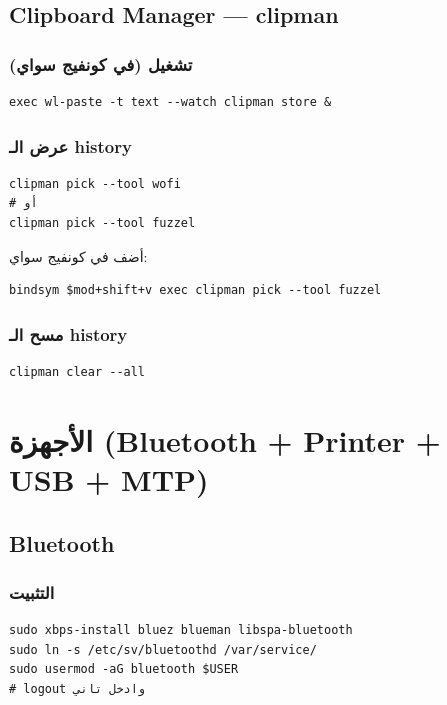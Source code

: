 \documentclass[12pt, a4paper]{report}
\begin{document}
\section{Clipboard Manager — clipman}

\subsection{تشغيل (في كونفيج سواي)}
\begin{lstlisting}
exec wl-paste -t text --watch clipman store &
\end{lstlisting}

\subsection{عرض الـ history}
\begin{lstlisting}
clipman pick --tool wofi
# أو
clipman pick --tool fuzzel
\end{lstlisting}

أضف في كونفيج سواي:
\begin{lstlisting}
bindsym $mod+shift+v exec clipman pick --tool fuzzel
\end{lstlisting}

\subsection{مسح الـ history}
\begin{lstlisting}
clipman clear --all
\end{lstlisting}

\chapter{الأجهزة (Bluetooth + Printer + USB + MTP)}

\section{Bluetooth}

\subsection{التثبيت}
\begin{lstlisting}
sudo xbps-install bluez blueman libspa-bluetooth
sudo ln -s /etc/sv/bluetoothd /var/service/
sudo usermod -aG bluetooth $USER
# logout وادخل تاني
\end{lstlisting}
\end{document}

